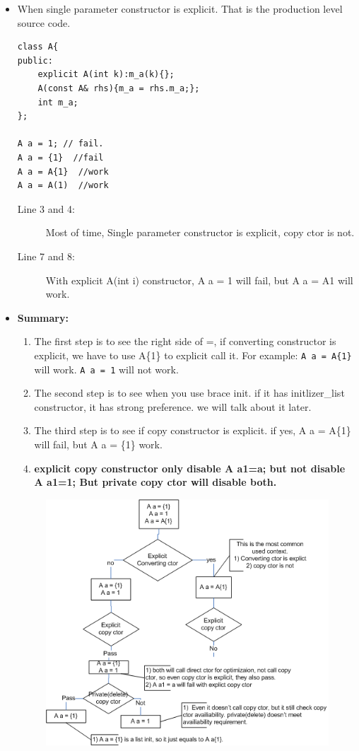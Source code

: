 \documentclass[a4paper,11pt,twoside]{book}
\begin{document}
\begin{itemize}
	\item  When single parameter constructor is explicit. That is the production level source code. 
\begin{lstlisting}
class A{
public:
	explicit A(int k):m_a(k){};
	A(const A& rhs){m_a = rhs.m_a;};
	int m_a;
};
	
A a = 1; // fail. 
A a = {1}  //fail
A a = A{1}  //work
A a = A(1)  //work
\end{lstlisting}
	\begin{description}
		\item[Line 3 and 4:] Most of time, Single parameter constructor is explicit, copy ctor is not.
		
		\item[Line 7 and 8:] With explicit A(int i) constructor, A a = 1 will fail, but A a = A{1} will work.
	\end{description}


\item \textbf{Summary:}
\begin{enumerate}
	\item The first step is to see the right side of =, if converting constructor is explicit, we have to use A\{1\} to explicit call it. For example: \texttt{A a = A\{1\}} will work. \texttt{A a = 1} will not work. 
	
	\item The second step is to see when you use brace init. if it has initlizer\_list constructor, it has strong preference. we will talk about it later.
	
	\item The third step is to see if copy constructor is explicit. if yes, A a = A\{1\} will fail, but A a = \{1\} work.
	
	\item \textbf{explicit copy constructor only disable A a1=a; but not disable A a1=1; But private copy ctor will disable both.}
	
\end{enumerate}

\begin{figure}[h]
	\centering
	\includegraphics[width=0.8\linewidth]{pics/copy_init.png}
	\caption{}
	\label{Explicit and init }
\end{figure}


\end{itemize}
\end{document}
